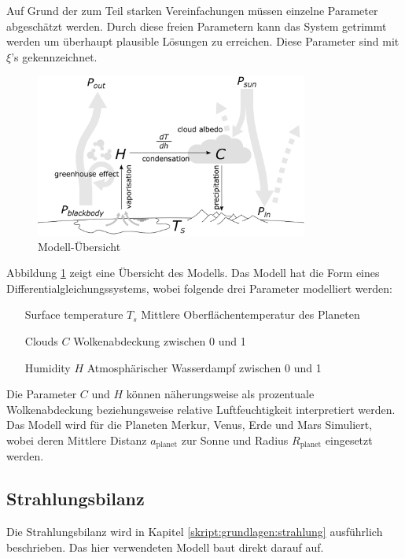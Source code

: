 \begin{refsection}
Auf Grund der zum Teil starken Vereinfachungen müssen einzelne Parameter abgeschätzt werden. Durch diese freien Parametern kann das System getrimmt werden um überhaupt plausible Lösungen zu erreichen. Diese Parameter sind mit $\xi$'s gekennzeichnet.

\begin{figure}
	\centering
	\includegraphics[width=0.8\textwidth]{planeten/Pictures/Model.eps}
	\caption{Modell-Übersicht}
	\label{planeten:model}
\end{figure}
Abbildung \ref{planeten:model} zeigt eine Übersicht des Modells.
Das Modell hat die Form eines Differentialgleichungssystems, wobei folgende drei Parameter modelliert werden:
\begin{itemize}
\item [Surface temperature $T_s$]	Mittlere Oberflächentemperatur des Planeten
\item [Clouds $C$]		Wolkenabdeckung zwischen 0 und 1
\item [Humidity $H$]		Atmosphärischer Wasserdampf zwischen 0 und 1
\end{itemize}
Die Parameter $C$ und $H$ können näherungsweise als prozentuale Wolkenabdeckung beziehungsweise relative Luftfeuchtigkeit  interpretiert werden.
Das Modell wird für die Planeten Merkur, Venus, Erde und Mars Simuliert, wobei deren Mittlere Distanz $a_\text{planet}$ zur Sonne und Radius $R_\text{planet}$ eingesetzt werden.

\subsection{Strahlungsbilanz}
Die Strahlungsbilanz wird in Kapitel \ref{skript:grundlagen:strahlung} ausführlich beschrieben. Das hier verwendeten Modell baut direkt darauf auf.


\end{refsection}
